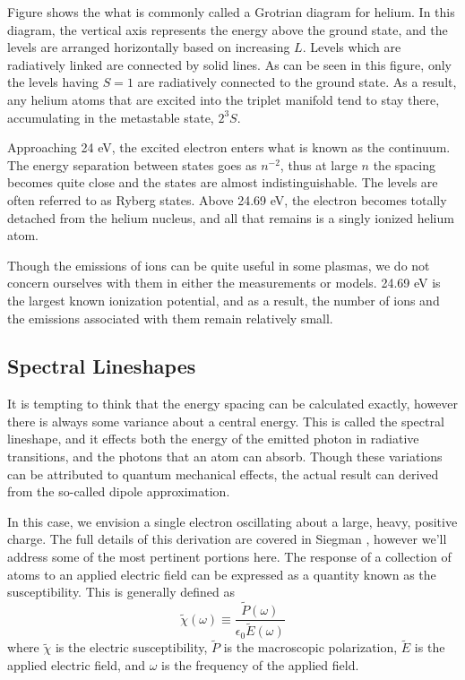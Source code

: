 Figure shows the what is commonly called a Grotrian diagram for helium.
In this diagram, the vertical axis represents the energy above the
ground state, and the levels are arranged horizontally based on
increasing $L$. Levels which are radiatively linked are connected by
solid lines. As can be seen in this figure, only the levels having $S=1$
are radiatively connected to the ground state. As a result, any helium
atoms that are excited into the triplet manifold tend to stay there,
accumulating in the metastable state, $2^3S$.

Approaching 24 eV, the excited electron enters what is known as the continuum.
The energy separation between states goes as $n^{-2}$, thus at large $n$ the
spacing becomes quite close and the states are almost indistinguishable. The
levels are often referred to as Ryberg states. Above 24.69 eV, the electron
becomes totally detached from the helium nucleus, and all that remains is
a singly ionized helium atom.

Though the emissions of ions can be quite useful in some plasmas, we do not
concern ourselves with them in either the measurements or models. 24.69 eV is
the largest known ionization potential, and as a result, the number of ions and
the emissions associated with them remain relatively small.

\subsection{Spectral Lineshapes}
It is tempting to think that the energy spacing can be calculated exactly,
however there is always some variance about a central energy. This is called the
spectral lineshape, and it effects both the energy of the emitted photon in
radiative transitions, and the photons that an atom can absorb. Though these
variations can be attributed to quantum mechanical effects, the actual result
can derived from the so-called dipole approximation.

In this case, we envision a single electron oscillating about a large, heavy,
positive charge. The full details of this derivation are covered in Siegman
\cite{Siegman1986}, however we'll address some of the most pertinent portions
here. The response of a collection of atoms to an applied electric field can be
expressed as a quantity known as the susceptibility. This is generally defined
as
\begin{equation}
    \tilde{\chi}(\omega) \equiv
    \frac{\tilde{P}(\omega)}{\epsilon_0\tilde{E}(\omega)}
\end{equation}
where $\tilde{\chi}$ is the electric susceptibility, $\tilde{P}$ is the
macroscopic polarization, $\tilde{E}$ is the applied electric field, and
$\omega$ is the frequency of the applied field.

